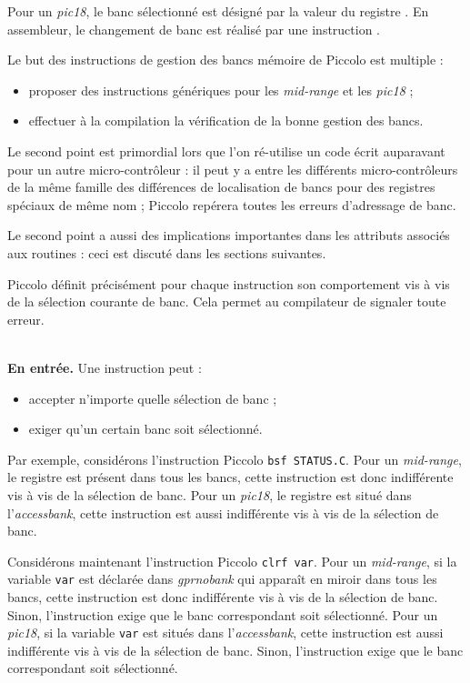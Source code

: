 Pour un \emph{pic18}, le banc sélectionné est désigné par la valeur du registre . En assembleur, le changement de banc est réalisé par une instruction .

Le but des instructions de gestion des bancs mémoire de Piccolo est multiple :
\begin{itemize}
  \item proposer des instructions génériques pour les \emph{mid-range} et les \emph{pic18} ;
  \item effectuer à la compilation la vérification de la bonne gestion des bancs.
\end{itemize}

Le second point est primordial lors que l'on ré-utilise un code écrit auparavant pour un autre micro-contrôleur : il peut y a entre les différents micro-contrôleurs de la même famille des différences de localisation de bancs pour des registres spéciaux de même nom ; Piccolo repérera toutes les erreurs d'adressage de banc.

Le second point a aussi des implications importantes dans les attributs associés aux routines : ceci est discuté dans les sections suivantes.









Piccolo définit précisément pour chaque instruction son comportement vis à vis de la sélection courante de banc. Cela permet au compilateur de signaler toute erreur.

~\\
\textbf{En entrée.} Une instruction peut :
\begin{itemize}
  \item accepter n'importe quelle sélection de banc ;
  \item exiger qu'un certain banc soit sélectionné.
\end{itemize}

Par exemple, considérons l'instruction Piccolo \texttt{bsf STATUS.C}. Pour un \emph{mid-range}, le registre  est présent dans tous les bancs, cette instruction est donc indifférente vis à vis de la sélection de banc. Pour un \emph{pic18}, le registre  est situé dans l'\emph{accessbank}, cette instruction est aussi indifférente vis à vis de la sélection de banc. 

Considérons maintenant l'instruction Piccolo \texttt{clrf var}. Pour un \emph{mid-range}, si la variable \texttt{var} est déclarée dans \emph{gprnobank} qui apparaît en miroir dans tous les bancs, cette instruction est donc indifférente vis à vis de la sélection de banc. Sinon, l'instruction exige que le banc correspondant soit sélectionné. Pour un \emph{pic18}, si la variable \texttt{var} est situés dans l'\emph{accessbank}, cette instruction est aussi indifférente vis à vis de la sélection de banc.  Sinon, l'instruction exige que le banc correspondant soit sélectionné. 


